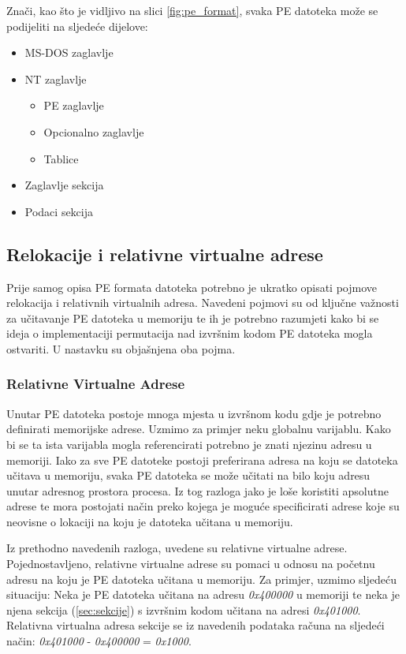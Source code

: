 \documentclass[times, utf8, diplomski, numeric]{fer}
\begin{document}

Znači, kao što je vidljivo na slici \ref{fig:pe_format}, svaka PE
datoteka može se podijeliti na sljedeće dijelove:

\begin{itemize}
\item MS-DOS zaglavlje
\item NT zaglavlje
	\begin{itemize}
	\item PE zaglavlje
	\item Opcionalno zaglavlje
	\item Tablice
	\end{itemize}
\item Zaglavlje sekcija
\item Podaci sekcija
\end{itemize}


\subsection{Relokacije i relativne virtualne adrese}

Prije samog opisa PE formata datoteka potrebno je ukratko
opisati pojmove relokacija i relativnih virtualnih adresa.
Navedeni pojmovi su od ključne važnosti za učitavanje PE datoteka
u memoriju te ih je potrebno razumjeti kako bi se ideja o
implementaciji permutacija nad izvršnim kodom PE datoteka mogla
ostvariti. U nastavku su objašnjena oba pojma.

\subsubsection{Relativne Virtualne Adrese}
\label{sct:rva}

Unutar PE datoteka postoje mnoga mjesta u izvršnom kodu gdje je
potrebno definirati memorijske adrese. Uzmimo za primjer neku
globalnu varijablu. Kako bi se ta ista varijabla mogla
referencirati potrebno je znati njezinu adresu u memoriji. Iako
za sve PE datoteke postoji preferirana adresa na koju se datoteka
učitava u memoriju, svaka PE datoteka se može učitati na bilo
koju adresu unutar adresnog prostora procesa. Iz tog razloga jako
je loše koristiti apsolutne adrese te mora postojati način preko
kojega je moguće specificirati adrese koje su neovisne o lokaciji
na koju je datoteka učitana u memoriju.

Iz prethodno navedenih razloga, uvedene su relativne virtualne
adrese. Pojednostavljeno, relativne virtualne adrese su pomaci u
odnosu na početnu adresu na koju je PE datoteka učitana u
memoriju. Za primjer, uzmimo sljedeću situaciju: Neka je PE
datoteka učitana na adresu \emph{0x400000} u memoriji te neka je
njena sekcija (\ref{sec:sekcije}) s izvršnim kodom učitana na
adresi \emph{0x401000}. Relativna virtualna adresa sekcije se iz
navedenih podataka računa na sljedeći način:					%
\emph{0x401000} - \emph{0x400000} = \emph{0x1000}.
\end{document}
